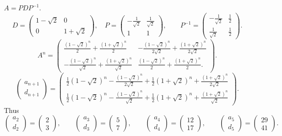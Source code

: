 \documentclass{article}
\theoremstyle{definition}
\theoremstyle{definition}
\begin{document}
$A=PDP^{-1}$.
\[
D=\begin{pmatrix}1-\sqrt{2}&0\\0&1+\sqrt{2}\end{pmatrix},
\quad 
P=\begin{pmatrix}-\frac{1}{\sqrt{2}}&\frac{1}{\sqrt{2}}\\
1&1\end{pmatrix},
\qquad 
P^{-1} = \begin{pmatrix}-\frac{1}{\sqrt{2}}&\frac{1}{2}\\
\frac{1}{\sqrt{2}}&\frac{1}{2}
\end{pmatrix}.
\]
\[
A^n = \begin{pmatrix}\frac{(1-\sqrt{2})^n}{2}+\frac{(1+\sqrt{2})^n}{2}&-\frac{(1-\sqrt{2})^n}{2\sqrt{2}}
+\frac{(1+\sqrt{2})^n}{2\sqrt{2}}\\
-\frac{(1-\sqrt{2})^n}{\sqrt{2}}+\frac{(1+\sqrt{2})^n}{\sqrt{2}}&
\frac{(1-\sqrt{2})^n}{2}+\frac{(1+\sqrt{2})^n}{2}.
\end{pmatrix}.
\]
\[
\begin{pmatrix}
a_{n+1}\\
d_{n+1}
\end{pmatrix}
=\begin{pmatrix}
\frac{1}{2} \left(1-\sqrt{2}\right)^n-\frac{\left(1-\sqrt{2}\right)^n}{2 \sqrt{2}}+\frac{1}{2} \left(1+\sqrt{2}\right)^n+\frac{\left(1+\sqrt{2}\right)^n}{2 \sqrt{2}}\\
\frac{1}{2} \left(1-\sqrt{2}\right)^n-\frac{\left(1-\sqrt{2}\right)^n}{\sqrt{2}}+\frac{1}{2} \left(1+\sqrt{2}\right)^n+\frac{\left(1+\sqrt{2}\right)^n}{\sqrt{2}}
\end{pmatrix}.
\]
Thus
\[
\begin{pmatrix}a_2\\d_2\end{pmatrix}
=\begin{pmatrix}
2\\3
\end{pmatrix},
\qquad
\begin{pmatrix}a_3\\d_3\end{pmatrix}
=\begin{pmatrix}
5\\7
\end{pmatrix},
\qquad
\begin{pmatrix}a_4\\d_4\end{pmatrix}
=\begin{pmatrix}
12\\17
\end{pmatrix},
\qquad
\begin{pmatrix}a_5\\d_5\end{pmatrix}
=\begin{pmatrix}
29\\41
\end{pmatrix}.
\]
\end{document}
